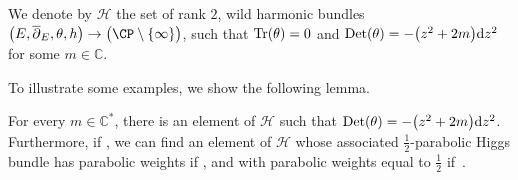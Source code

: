 \begin{Definition}
We denote by $\mathcal{H}$ the set of rank $2$, wild harmonic bundles $\bigl(E,\overline{\partial}_E,\theta,h\bigr)\to \bigl(\CP\setminus \{\infty\}\bigr)$, such that $\textnormal{Tr}(\theta)=0$ and $\textnormal{Det}(\theta)=-\bigl(z^2+2m\bigr){\rm d}z^2$ for some $m \in \mathbb{C}$.

\end{Definition}

To illustrate some examples, we show the following lemma.

\begin{Lemma}\label{C1} For every $m\in \mathbb{C}^*$, there is an element of $\mathcal{H}$ such that $\operatorname{Det}(\theta)=-\bigl(z^2+2m\bigr){\rm d}z^2$. Furthermore, if \smash{$m^{(3)}\in \bigl(-\frac12,\frac12\bigr]$}, we can find an element of $\mathcal{H}$ whose associated $\frac{1}{2}$-parabolic Higgs bundle has parabolic weights  if , and with parabolic weights equal to $\frac{1}{2}$ if~.
\end{Lemma}

